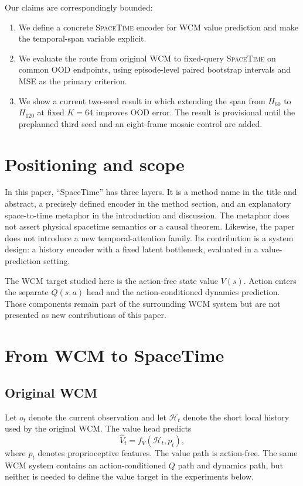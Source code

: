 \documentclass[10pt,a4paper]{article}
\newcommand{\SpaceTime}{\textsc{SpaceTime}}
\begin{document}
Our claims are correspondingly bounded:
\begin{enumerate}
  \item We define a concrete \SpaceTime{} encoder for WCM value prediction and make the temporal-span variable explicit.
  \item We evaluate the route from original WCM to fixed-query \SpaceTime{} on common OOD endpoints, using episode-level paired bootstrap intervals and MSE as the primary criterion.
  \item We show a current two-seed result in which extending the span from $H_{60}$ to $H_{120}$ at fixed $K=64$ improves OOD error. The result is provisional until the preplanned third seed and an eight-frame mosaic control are added.
\end{enumerate}

\section{Positioning and scope}

In this paper, ``SpaceTime'' has three layers. It is a method name in the title and abstract, a precisely defined encoder in the method section, and an explanatory space-to-time metaphor in the introduction and discussion. The metaphor does not assert physical spacetime semantics or a causal theorem. Likewise, the paper does not introduce a new temporal-attention family. Its contribution is a system design: a history encoder with a fixed latent bottleneck, evaluated in a value-prediction setting.

The WCM target studied here is the action-free state value $V(s)$. Action enters the separate $Q(s,a)$ head and the action-conditioned dynamics prediction. Those components remain part of the surrounding WCM system but are not presented as new contributions of this paper.

\section{From WCM to SpaceTime}

\subsection{Original WCM}

Let $o_t$ denote the current observation and let $\mathcal{H}_t$ denote the short local history used by the original WCM. The value head predicts
\begin{equation}
  \hat V_t = f_V(\mathcal{H}_t, p_t),
\end{equation}
where $p_t$ denotes proprioceptive features. The value path is action-free. The same WCM system contains an action-conditioned $Q$ path and dynamics path, but neither is needed to define the value target in the experiments below.
\end{document}
